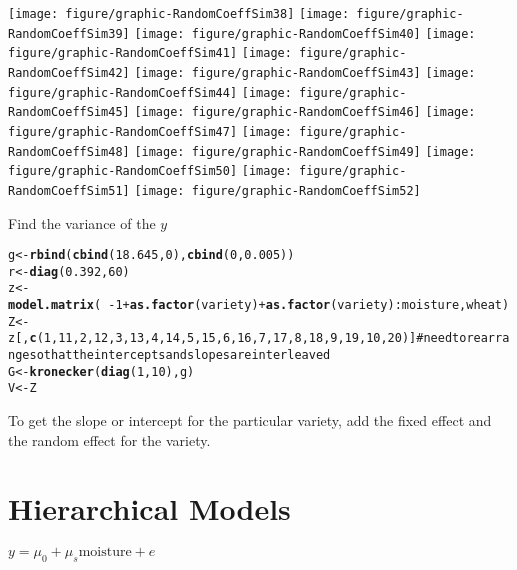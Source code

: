 \documentclass[12pt,letterpaper,oneside]{article}\usepackage{graphicx, color}
\makeatletter
\newcommand{\hlfunctioncall}[1]{\textcolor[rgb]{0.501960784313725,0,0.329411764705882}{\textbf{#1}}}%
\newcommand{\hlcomment}[1]{\textcolor[rgb]{0.180392156862745,0.6,0.341176470588235}{#1}}%
\newenvironment{kframe}{%
 \def\at@end@of@kframe{}%
 \ifinner\ifhmode%
  \def\at@end@of@kframe{\end{minipage}}%
  \begin{minipage}{\columnwidth}%
 \fi\fi%
 \def\FrameCommand##1{\hskip\@totalleftmargin \hskip-\fboxsep
 \colorbox{shadecolor}{##1}\hskip-\fboxsep
     \hskip-\linewidth \hskip-\@totalleftmargin \hskip\columnwidth}%
 \MakeFramed {\advance\hsize-\width
   \@totalleftmargin\z@ \linewidth\hsize
   \@setminipage}}%
 {\par\unskip\endMakeFramed%
 \at@end@of@kframe}
\newenvironment{knitrout}{}{} %
\newcommand{\dateTaken}{January 7, 2013}
\makeatother
\begin{document}
\begin{knitrout}
{\texttt{[image: figure/graphic-RandomCoeffSim38]} 
\texttt{[image: figure/graphic-RandomCoeffSim39]} 
\texttt{[image: figure/graphic-RandomCoeffSim40]} 
\texttt{[image: figure/graphic-RandomCoeffSim41]} 
\texttt{[image: figure/graphic-RandomCoeffSim42]} 
\texttt{[image: figure/graphic-RandomCoeffSim43]} 
\texttt{[image: figure/graphic-RandomCoeffSim44]} 
\texttt{[image: figure/graphic-RandomCoeffSim45]} 
\texttt{[image: figure/graphic-RandomCoeffSim46]} 
\texttt{[image: figure/graphic-RandomCoeffSim47]} 
\texttt{[image: figure/graphic-RandomCoeffSim48]} 
\texttt{[image: figure/graphic-RandomCoeffSim49]} 
\texttt{[image: figure/graphic-RandomCoeffSim50]} 
\texttt{[image: figure/graphic-RandomCoeffSim51]} 
\texttt{[image: figure/graphic-RandomCoeffSim52]} 

}



\end{knitrout}


Find the variance of the $y$
\begin{knitrout}\scriptsize
{}\color{fgcolor}\begin{kframe}
\begin{alltt}
g <- \hlfunctioncall{rbind}(\hlfunctioncall{cbind}(18.645, 0), \hlfunctioncall{cbind}(0, 0.005))
r <- \hlfunctioncall{diag}(0.392, 60)
z <- \hlfunctioncall{model.matrix}(~-1 + \hlfunctioncall{as.factor}(variety) + \hlfunctioncall{as.factor}(variety):moisture, wheat)
Z <- z[, \hlfunctioncall{c}(1, 11, 2, 12, 3, 13, 4, 14, 5, 15, 6, 16, 7, 17, 8, 18, 9, 19, 10, 20)]  \hlcomment{# need to rearrange so that the intercepts and slopes are interleaved}
G <- \hlfunctioncall{kronecker}(\hlfunctioncall{diag}(1, 10), g)
V <- Z %*% G %*% \hlfunctioncall{t}(Z) + r
\end{alltt}
\end{kframe}
\end{knitrout}

\renewcommand{\dateTaken}{March  7, 2013}
\daysep

To get the slope or intercept for the particular variety, add the fixed effect and the random effect for the variety.
\section{Hierarchical Models} %
\label{sec:hierarchical_models}
$y=\mu_{0}+\mu_{s}\text{moisture} + e$
\end{document}
